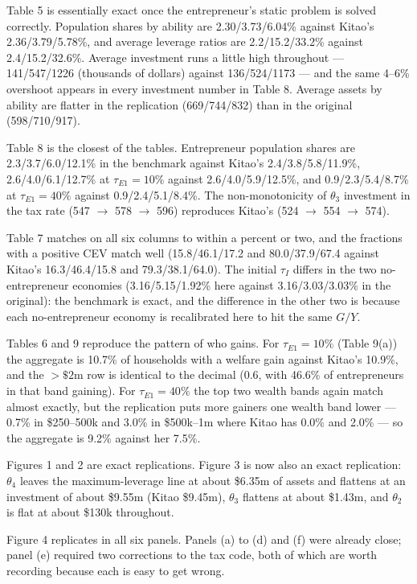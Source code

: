 \documentclass[11pt,fleqn]{article}
\begin{document}
Table 5 is essentially exact once the entrepreneur's static problem is solved correctly. Population shares by ability are 2.30/3.73/6.04\% against Kitao's 2.36/3.79/5.78\%, and average leverage ratios are 2.2/15.2/33.2\% against 2.4/15.2/32.6\%. Average investment runs a little high throughout --- 141/547/1226 (thousands of dollars) against 136/524/1173 --- and the same 4--6\% overshoot appears in every investment number in Table 8. Average assets by ability are flatter in the replication (669/744/832) than in the original (598/710/917).

Table 8 is the closest of the tables. Entrepreneur population shares are 2.3/3.7/6.0/12.1\% in the benchmark against Kitao's 2.4/3.8/5.8/11.9\%, 2.6/4.0/6.1/12.7\% at $\tau_{E1}=10\%$ against 2.6/4.0/5.9/12.5\%, and 0.9/2.3/5.4/8.7\% at $\tau_{E1}=40\%$ against 0.9/2.4/5.1/8.4\%. The non-monotonicity of $\theta_3$ investment in the tax rate (547 $\rightarrow$ 578 $\rightarrow$ 596) reproduces Kitao's (524 $\rightarrow$ 554 $\rightarrow$ 574).

Table 7 matches on all six columns to within a percent or two, and the fractions with a positive CEV match well (15.8/46.1/17.2 and 80.0/37.9/67.4 against Kitao's 16.3/46.4/15.8 and 79.3/38.1/64.0). The initial $\tau_I$ differs in the two no-entrepreneur economies (3.16/5.15/1.92\% here against 3.16/3.03/3.03\% in the original): the benchmark is exact, and the difference in the other two is because each no-entrepreneur economy is recalibrated here to hit the same $G/Y$.

Tables 6 and 9 reproduce the pattern of who gains. For $\tau_{E1}=10\%$ (Table 9(a)) the aggregate is 10.7\% of households with a welfare gain against Kitao's 10.9\%, and the $>\$2$m row is identical to the decimal (0.6, with 46.6\% of entrepreneurs in that band gaining). For $\tau_{E1}=40\%$ the top two wealth bands again match almost exactly, but the replication puts more gainers one wealth band lower --- 0.7\% in \$250--500k and 3.0\% in \$500k--1m where Kitao has 0.0\% and 2.0\% --- so the aggregate is 9.2\% against her 7.5\%.

Figures 1 and 2 are exact replications. Figure 3 is now also an exact replication: $\theta_4$ leaves the maximum-leverage line at about \$6.35m of assets and flattens at an investment of about \$9.55m (Kitao \$9.45m), $\theta_3$ flattens at about \$1.43m, and $\theta_2$ is flat at about \$130k throughout.

Figure 4 replicates in all six panels. Panels (a) to (d) and (f) were already close; panel (e) required two corrections to the tax code, both of which are worth recording because each is easy to get wrong.
\end{document}
